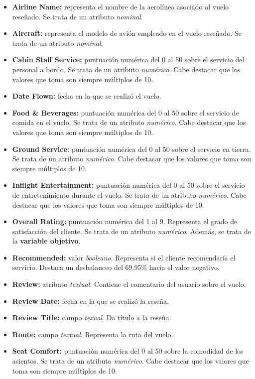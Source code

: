 \documentclass[es]{uc3mreport}
\begin{document}
\begin{report}
\begin{itemize}
    \item \textbf{Airline Name:} representa el nombre de la aerolínea asociado al vuelo reseñado. Se trata de un atributo \textit{nominal}.
    \item \textbf{Aircraft:} representa el modelo de avión empleado en el vuelo reseñado. Se trata de un atributo \textit{nominal}.
    \item \textbf{Cabin Staff Service:} puntuación numérica del 0 al 50 sobre el servicio del personal a bordo. Se trata de un atributo \textit{numérico}. Cabe destacar que los valores que toma son siempre múltiplos de 10.
    \item \textbf{Date Flown:} fecha en la que se realizó el vuelo.
    \item \textbf{Food \& Beverages:} puntuación numérica del 0 al 50 sobre el servicio de comida en el vuelo. Se trata de un atributo \textit{numérico}. Cabe destacar que los valores que toma son siempre múltiplos de 10.
    \item \textbf{Ground Service:} puntuación numérica del 0 al 50 sobre el servicio en tierra. Se trata de un atributo \textit{numérico}. Cabe destacar que los valores que toma son siempre múltiplos de 10.
    \item \textbf{Inflight Entertainment:} puntuación numérica del 0 al 50 sobre el servicio de entretenimiento durante el vuelo. Se trata de un atributo \textit{numérico}. Cabe destacar que los valores que toma son siempre múltiplos de 10.
    \item \textbf{Overall Rating:} puntuación numérica del 1 al 9. Representa el
    grado de satisfacción del cliente. Se trata de un atributo
    \textit{numérico}. Además, se trata de la \textbf{variable objetivo}.
    \item \textbf{Recommended:} valor \textit{booleano}. Representa si el cliente recomendaría el servicio. Destaca un desbalanceo del 69.95\% hacia el valor negativo.
    \item \textbf{Review:} atributo \textit{textual}. Contiene el comentario del usuario sobre el vuelo.
    \item \textbf{Review Date:} fecha en la que se realizó la reseña.
    \item \textbf{Review Title:} campo \textit{texual}. Da título a la reseña.
    \item \textbf{Route:} campo \textit{textual}. Representa la ruta del vuelo.
    \item \textbf{Seat Comfort:} puntuación numérica del 0 al 50 sobre la comodidad de los asientos. Se trata de un atributo \textit{numérico}. Cabe destacar que los valores que toma son siempre múltiplos de 10.

\end{itemize}
\end{report}
\end{document}

